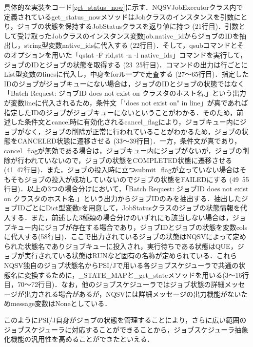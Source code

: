 具体的な実装をコード\ref{get_status_now}に示す．NQSVJobExecutorクラス内で定義されているget\_status\_nowメソッドはJobクラスのインスタンスを引数にとり，ジョブの状態を保持するJobStatusクラスを返り値に持つ (21行目)．引数として受け取ったJobクラスのインスタンス変数job.native\_idからジョブのIDを抽出し，string型変数native\_idsに代入する (22行目)．そして，qsubコマンドとそのオプションを用いた「qstat -F rid,stt -n -l native\_ids」コマンドを実行して，ジョブのIDとジョブの状態を取得する (23~25行目)\cite{nqsv_reference}．コマンドの出力は行ごとにList型変数のlinesに代入し，中身をforループで走査する (27～65行目)．指定したIDのジョブがジョブキューにない場合は，ジョブのIDとジョブの状態ではなく「Batch Request: ジョブID does not exist on クラスタのホスト名.」という出力が変数lineに代入されるため，条件文「"does not exist on" in line」が真であれば指定したIDのジョブがジョブキューにないということがわかる．そのため，前述した条件文とcancel時に有効化されるcancel\_flagにより，ジョブキュー内にジョブがなく，ジョブの削除が正常に行われていることがわかるため，ジョブの状態をCANCELED状態に遷移させる (33～39行目)．一方，条件文が真であり，cancel\_flagが無効である場合は，ジョブキュー内にジョブがないが，ジョブの削除が行われていないので，ジョブの状態をCOMPLETED状態に遷移させる (41~47行目)．また，ジョブの投入時に立つsubmit\_flagが立っていない場合はそもそもジョブの投入が成功していないのでジョブの状態をFAILEDにする (49~55行目)．以上の3つの場合分けにおいて，「Batch Request: ジョブID does not exist on クラスタのホスト名.」という出力からジョブIDのみを抽出する．抽出したジョブIDごとにDict型変数rを用意して，JobStatusクラスのジョブの状態情報を代入する．また，前述した3種類の場合分けのいずれにも該当しない場合は，ジョブキュー内にジョブが存在する場合であり，ジョブIDとジョブの状態を変数colsに代入する(58行目)．ここで出力されているジョブの状態はNQSVによって定められた状態名でありジョブキューに投入され，実行待ちである状態はQUE，ジョブが実行されている状態はRUNなど固有の名称が定められている．これらNQSV独自のジョブ状態名からPSI/Jで用いる各ジョブスケジューラで共通の状態名に変換するために，\_STATE\_MAPと\_get\_stateメソッドを用いる(3～16行目，70～72行目)．なお，他のジョブスケジューラではジョブ状態の詳細メッセージが出力される場合があるが，NQSVには詳細メッセージの出力機能がないためmessage変数はNoneとしている．\par
このようにPSI/J自身がジョブの状態を管理することにより，さらに広い範囲のジョブスケジューラに対応することができることから，ジョブスケジューラ抽象化機能の汎用性を高めることができたといえる．\par

